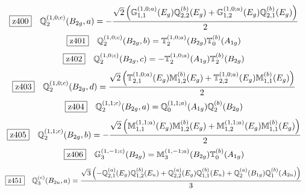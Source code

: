 \documentclass[fleqn,10pt,landscape]{jsarticle}
\begin{document}
\begin{dmath*}
\hspace*{3mm}\fbox{z400}\quad \mathbb{Q}_{2}^{(1,0;c)}(B_{2g},a)=- \frac{\sqrt{2} \left(\mathbb{G}_{1,1}^{(1,0;a)}(E_{g}) \mathbb{Q}_{2,2}^{(b)}(E_{g}) + \mathbb{G}_{1,2}^{(1,0;a)}(E_{g}) \mathbb{Q}_{2,1}^{(b)}(E_{g})\right)}{2}
\end{dmath*}
\begin{dmath*}
\hspace*{3mm}\fbox{z401}\quad \mathbb{Q}_{2}^{(1,0;c)}(B_{2g},b)=\mathbb{T}_{2}^{(1,0;a)}(B_{2g}) \mathbb{T}_{0}^{(b)}(A_{1g})
\end{dmath*}
\begin{dmath*}
\hspace*{3mm}\fbox{z402}\quad \mathbb{Q}_{2}^{(1,0;c)}(B_{2g},c)=- \mathbb{T}_{2}^{(1,0;a)}(A_{1g}) \mathbb{T}_{2}^{(b)}(B_{2g})
\end{dmath*}
\begin{dmath*}
\hspace*{3mm}\fbox{z403}\quad \mathbb{Q}_{2}^{(1,0;c)}(B_{2g},d)=\frac{\sqrt{2} \left(\mathbb{T}_{2,1}^{(1,0;a)}(E_{g}) \mathbb{M}_{1,2}^{(b)}(E_{g}) + \mathbb{T}_{2,2}^{(1,0;a)}(E_{g}) \mathbb{M}_{1,1}^{(b)}(E_{g})\right)}{2}
\end{dmath*}
\begin{dmath*}
\hspace*{3mm}\fbox{z404}\quad \mathbb{Q}_{2}^{(1,1;c)}(B_{2g},a)=\mathbb{Q}_{0}^{(1,1;a)}(A_{1g}) \mathbb{Q}_{2}^{(b)}(B_{2g})
\end{dmath*}
\begin{dmath*}
\hspace*{3mm}\fbox{z405}\quad \mathbb{Q}_{2}^{(1,1;c)}(B_{2g},b)=- \frac{\sqrt{2} \left(\mathbb{M}_{1,1}^{(1,1;a)}(E_{g}) \mathbb{M}_{1,2}^{(b)}(E_{g}) + \mathbb{M}_{1,2}^{(1,1;a)}(E_{g}) \mathbb{M}_{1,1}^{(b)}(E_{g})\right)}{2}
\end{dmath*}
\begin{dmath*}
\hspace*{3mm}\fbox{z406}\quad \mathbb{G}_{3}^{(1,-1;c)}(B_{2g})=\mathbb{M}_{3}^{(1,-1;a)}(B_{2g}) \mathbb{T}_{0}^{(b)}(A_{1g})
\end{dmath*}
\begin{dmath*}
\hspace*{3mm}\fbox{z451}\quad \mathbb{Q}_{3}^{(c)}(B_{2u},a)=\frac{\sqrt{3} \left(- \mathbb{Q}_{2,1}^{(a)}(E_{g}) \mathbb{Q}_{1,2}^{(b)}(E_{u}) + \mathbb{Q}_{2,2}^{(a)}(E_{g}) \mathbb{Q}_{1,1}^{(b)}(E_{u}) + \mathbb{Q}_{2}^{(a)}(B_{1g}) \mathbb{Q}_{1}^{(b)}(A_{2u})\right)}{3}
\end{dmath*}
\end{document}
